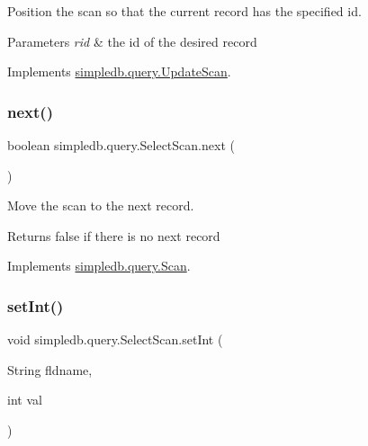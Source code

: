 Position the scan so that the current record has the specified id. 
\begin{DoxyParams}{Parameters}
{\em rid} & the id of the desired record \\
\hline
\end{DoxyParams}


Implements \hyperlink{interfacesimpledb_1_1query_1_1UpdateScan_a5096e90da6d88cfaa015cd3aa20bc9d7}{simpledb.\+query.\+Update\+Scan}.

\mbox{\label{classsimpledb_1_1query_1_1SelectScan_aefb8c0f74e03179755553ce178f7504d}} 
\subsubsection{\texorpdfstring{next()}{next()}}
{\footnotesize\ttfamily boolean simpledb.\+query.\+Select\+Scan.\+next (\begin{DoxyParamCaption}{ }\end{DoxyParamCaption})\hspace{0.3cm}{\ttfamily [inline]}}

Move the scan to the next record. \begin{DoxyReturn}{Returns}
false if there is no next record 
\end{DoxyReturn}


Implements \hyperlink{interfacesimpledb_1_1query_1_1Scan_a5fc77b7c76d91f89f6c09ac4f15ef351}{simpledb.\+query.\+Scan}.

\mbox{\label{classsimpledb_1_1query_1_1SelectScan_a1c800a9b658cc70338670412913ac614}} 
\subsubsection{\texorpdfstring{set\+Int()}{setInt()}}
{\footnotesize\ttfamily void simpledb.\+query.\+Select\+Scan.\+set\+Int (\begin{DoxyParamCaption}\item[{String}]{fldname,  }\item[{int}]{val }\end{DoxyParamCaption})\hspace{0.3cm}{\ttfamily [inline]}}

